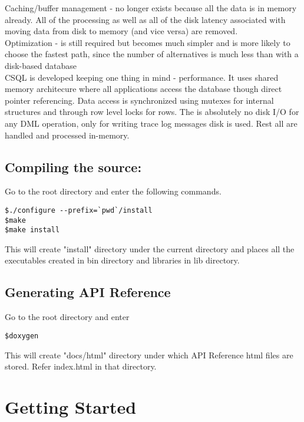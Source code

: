 \documentclass[12pt]{article}
\begin{document}
    Caching/buffer management - no longer exists because all the data is in memory already. All of the 
               processing as well as all of the disk latency associated with moving data from disk to 
               memory (and vice versa) are removed. \\

    Optimization - is still required but becomes much simpler and is more likely to choose the fastest path, 
               since the number of alternatives is much less than with a disk-based database \\

CSQL is developed keeping one thing in mind - performance. It uses shared memory architecure where all
applications access the database though direct pointer referencing. Data access is synchronized using mutexes
 for internal structures and through row level locks for rows. The is absolutely no disk I/O for any DML operation,
only for writing trace log messages disk is used. Rest all are handled and processed in-memory. \\

\subsection{Compiling the source:}
\label{compsrc}
Go to the root directory and enter the following commands. 
\begin{verbatim}
$./configure --prefix=`pwd`/install
$make
$make install
\end{verbatim}

This will create "install" directory under the current directory and places all the executables created in bin directory and libraries in lib directory. \\

\subsection{Generating API Reference}
\label{genAPIref}
Go to the root directory and enter
\begin{verbatim}
$doxygen
\end{verbatim}

This will create "docs/html" directory under which API Reference html files are stored. Refer index.html in that directory.

\section{Getting Started}
\label{getstarted}
\end{document}
